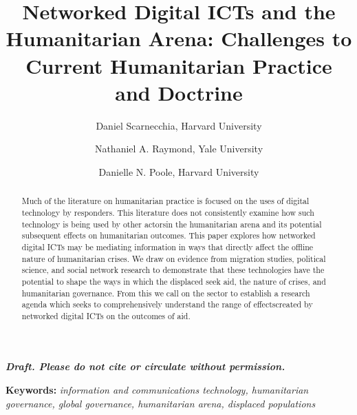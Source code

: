 \documentclass[
]{article}
\title{Networked Digital ICTs and the Humanitarian Arena: Challenges to
Current Humanitarian Practice and Doctrine}
\author{Daniel Scarnecchia, Harvard University \and Nathaniel A.
Raymond, Yale University \and Danielle N. Poole, Harvard University}
\date{}
\begin{document}
\maketitle
\begin{abstract}
Much of the literature on humanitarian practice is focused on the uses
of digital technology by responders. This literature does not
consistently examine how such technology is being used by other actorsin
the humanitarian arena and its potential subsequent effects on
humanitarian outcomes. This paper explores how networked digital ICTs
may be mediating information in ways that directly affect the offline
nature of humanitarian crises. We draw on evidence from migration
studies, political science, and social network research to demonstrate
that these technologies have the potential to shape the ways in which
the displaced seek aid, the nature of crises, and humanitarian
governance. From this we call on the sector to establish a research
agenda which seeks to comprehensively understand the range of
effectscreated by networked digital ICTs on the outcomes of aid.
\end{abstract}

\textbf{\emph{Draft. Please do not cite or circulate without
permission.}}

\textbf{Keywords:} \emph{information and communications technology,
humanitarian governance, global governance, humanitarian arena,
displaced populations}
\end{document}
